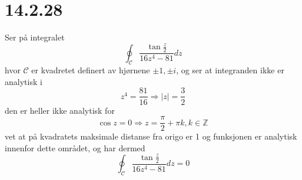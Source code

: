 \documentclass{report}
\newcommand{\M}[2]{\mathbb{#1}^{#2}}
\begin{document}
\section*{14.2.28}
Ser på integralet
\begin{equation}
  \label{eq:27}
  \oint_{\mathcal{C}} \frac{\tan \frac{z}{2}}{16z^{4} - 81} dz
\end{equation}
hvor $\mathcal{C}$ er kvadretet definert av hjørnene $\pm 1, \pm i$, og ser at integranden ikke er analytisk i
\begin{equation}
  \label{eq:28}
  z^{4} = \frac{81}{16} \Rightarrow |z| = \frac{3}{2}
\end{equation}
den er heller ikke analytisk for
\begin{equation}
  \label{eq:29}
  \cos z = 0 \Rightarrow z = \frac{\pi}{2} + \pi k, k \in \M{Z}{}
\end{equation}
vet at på kvadratets maksimale distanse fra origo er 1 og funksjonen er analytisk innenfor dette området, og har dermed
\begin{equation}
  \label{eq:30}
  \oint_{\mathcal{C}} \frac{\tan \frac{z}{2}}{16z^{4} - 81} dz = 0
\end{equation}
\end{document}
